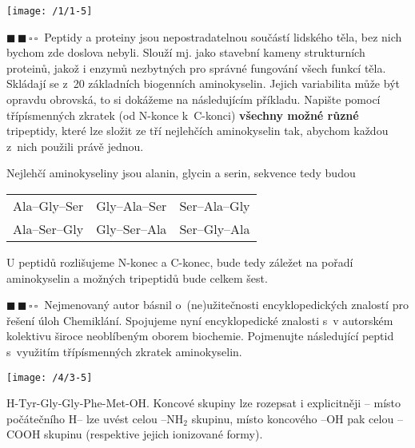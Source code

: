 \documentclass{book}
\newcommand{\dva}{$\blacksquare \, \blacksquare \, \square \, \square \; \; $}
\renewenvironment{quotation}{\par}{\par} %
\begin{document}
\begin{center}
\texttt{[image: /1/1-5]}
\end{center}


\hrulefill %
\begin{quotation}
\dva Peptidy a proteiny jsou nepostradatelnou součástí lidského těla, bez nich bychom
zde doslova nebyli. Slouží mj. jako stavební kameny strukturních proteinů, jakož i
enzymů nezbytných pro správné fungování všech funkcí těla. Skládají se z~20
základních biogenních aminokyselin. Jejich variabilita může být opravdu
obrovská, to si dokážeme na následujícím příkladu. Napište pomocí
třípísmenných zkratek (od N-konce k~C-konci) \textbf{všechny možné
různé} tripeptidy, které lze složit ze tří nejlehčích aminokyselin
tak, abychom každou z~nich použili právě jednou.
\end{quotation} \dotfill \par 
Nejlehčí aminokyseliny jsou alanin, glycin a serin, sekvence tedy budou 
\begin{center}
\begin{tabular}{lcr}
Ala--Gly--Ser & Gly--Ala--Ser & Ser--Ala--Gly\tabularnewline
Ala--Ser--Gly & Gly--Ser--Ala & Ser--Gly--Ala\tabularnewline
\end{tabular}
\par\end{center}

U peptidů rozlišujeme N-konec a C-konec, bude tedy záležet
na pořadí aminokyselin a možných tripeptidů bude celkem šest.

\hrulefill %
\begin{quotation}
\dva Nejmenovaný autor básnil o~(ne)užitečnosti encyklopedických
znalostí pro řešení úloh Chemiklání. Spojujeme nyní encyklopedické
znalosti s~v autorském kolektivu široce neoblíbeným oborem biochemie.
Pojmenujte následující peptid s~využitím třípísmenných zkratek aminokyselin.
\begin{center}

\texttt{[image: /4/3-5]}

\par\end{center}

\end{quotation} \dotfill \par 
H-Tyr-Gly-Gly-Phe-Met-OH. Koncové skupiny lze rozepsat i explicitněji -- místo počátečního H-- lze uvést celou --NH$_2$ skupinu, místo koncového --OH pak celou --COOH skupinu (respektive jejich ionizované formy).
\end{document}
